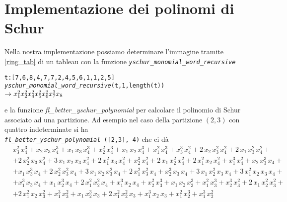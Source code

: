 \section{Implementazione dei polinomi di Schur}
Nella nostra implementazione possiamo determinare l'immagine tramite
\eqref{ring_tab} di un tableau con la funzione
\texttt{\emph{yschur\_monomial\_word\_recursive}}
\begin{alltt}
t:[7,6,8,4,7,7,2,4,5,6,1,1,2,5]
\emph{yschur\_monomial\_word\_recursive} (t, 1, length (t))
\(\rightarrow x\sb1\sp2 x\sb2\sp2 x\sb4\sp2 x\sb5\sp2 x\sb6\sp2 x\sb7\sp3 x\sb8\) 
\end{alltt} 
e la funzione \emph{fl\_better\_yschur\_polynomial} per calcolare il
polinomio di Schur associato ad una partizione. Ad esempio nel caso della partizione
$(2,3)$ con quattro indeterminate si ha\\
\texttt{\emph{fl\_better\_yschur\_polynomial} ([2,3], 4)}
che ci d\`a
\begin{align*}
&x_{3}^2\,x_{4}^3+x_{2}\,x_{3}\,x_{4}^3+x_{1}\,x_{3}\,x_{4}^3+x_{2}^2\,x_{4}^3+x_{1}\,x_{2}\,x_{4}^3+x_{1}^2\,x_{4}^3+x_{3}^3\,x_{4}^2+2\,x_{2}\,x_{3}^2\,x_{4}^2+2\,x_{1}\,x_{3}^2\,x_{4}^2+&\\
&+2\,x_{2}^2\,x_{3}\,x_{4}^2+3\,x_{1}\,x_{2}\,x_{3}\,x_{4}^2+2\,x_{1}^2\,x_{3}\,x_{4}^2+x_{2}^3\,x_{4}^2+2\,x_{1}\,x_{2}^2\,x_{4}^2+2\,x_{1}^2\,x_{2}\,x_{4}^2+x_{1}^3\,x_{4}^2+x_{2}\,x_{3}^3\,x_{4}+&\\
&+x_{1}\,x_{3}^3\,x_{4}+2\,x_{2}^2\,x_{3}^2\,x_{4}+3\,x_{1}\,x_{2}\,x_{3}^2\,x_{4}+2\,x_{1}^2\,x_{3}^2\,x_{4}+x_{2}^3\,x_{3}\,x_{4}+3\,x_{1}\,x_{2}^2\,x_{3}\,x_{4}+3\,x_{1}^2\,x_{2}\,x_{3}\,x_{4}+&\\
&+x_{1}^3\,x_{3}\,x_{4}+x_{1}\,x_{2}^3\,x_{4}+2\,x_{1}^2\,x_{2}^2\,x_{4}+x_{1}^3\,x_{2}\,x_{4}+x_{2}^2\,x_{3}^3+x_{1}\,x_{2}\,x_{3}^3+x_{1}^2\,x_{3}^3+x_{2}^3\,x_{3}^2+2\,x_{1}\,x_{2}^2\,x_{3}^2+&\\
&+2\,x_{1}^2\,x_{2}\,x_{3}^2+x_{1}^3\,x_{3}^2+x_{1}\,x_{2}^3\,x_{3}+2\,x_{1}^2\,x_{2}^2\,x_{3}+x_{1}^3\,x_{2}\,x_{3}+x_{1}^2\,x_{2}^3+x_{1}^3\,x_{2}^2
\end{align*}

